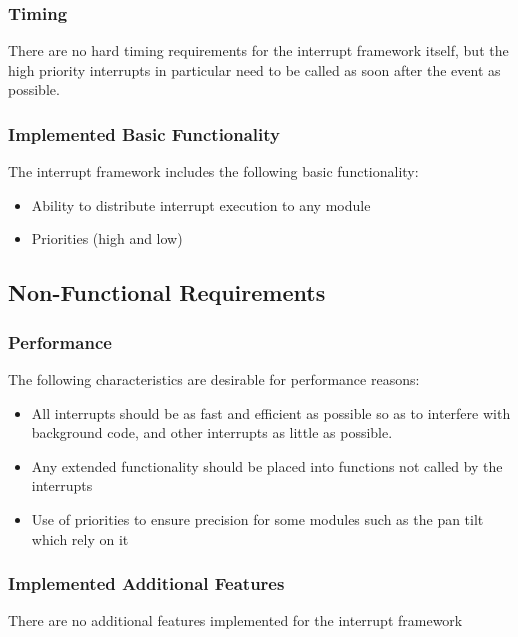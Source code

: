 \documentclass[]{report}
\begin{document}
\subsubsection{Timing}
There are no hard timing requirements for the interrupt framework itself, but the high priority interrupts in particular need to be called as soon after the event as possible.

\subsubsection{Implemented Basic Functionality}
The interrupt framework includes the following basic functionality:
\begin{itemize}
	\item Ability to distribute interrupt execution to any module
	\item Priorities (high and low)
\end{itemize}

\subsection{Non-Functional Requirements}
\subsubsection{Performance}
The following characteristics are desirable for performance reasons:
\begin{itemize}
	\item All interrupts should be as fast and efficient as possible so as to interfere with background code, and other interrupts as little as possible. 
	\item Any extended functionality should be placed into functions not called by the interrupts
	\item Use of priorities to ensure precision for some modules such as the pan tilt which rely on it
\end{itemize}


\subsubsection{Implemented Additional Features}
There are no additional features implemented for the interrupt framework
\end{document}
